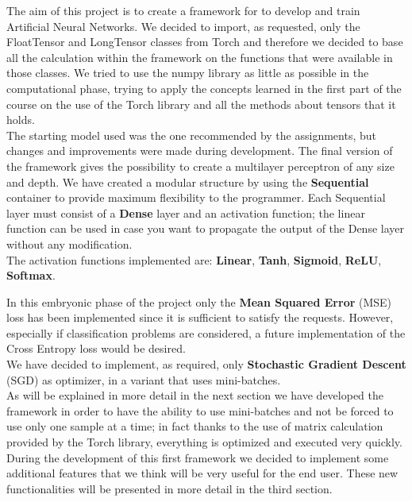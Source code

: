 The aim of this project is to create a framework for to develop and train Artificial Neural Networks. We decided to import, as requested, only the FloatTensor and LongTensor classes from Torch and therefore we decided to base all the calculation within the framework on the functions that were available in those classes. We tried to use the numpy library as little as possible in the computational phase, trying to apply the concepts learned in the first part of the course on the use of the Torch library and all the methods about tensors that it holds.\\
The starting model used was the one recommended by the assignments, but changes and improvements were made during development. The final version of the framework gives the possibility to create a multilayer perceptron of any size and depth. We have created a modular structure by using the \textbf{Sequential} container to provide maximum flexibility to the programmer. Each Sequential layer must consist of a \textbf{Dense} layer and an activation function; the linear function can be used in case you want to propagate the output of the Dense layer without any modification. \\
The activation functions implemented are: \textbf{Linear}, \textbf{Tanh}, \textbf{Sigmoid}, \textbf{ReLU}, \textbf{Softmax}. \\
\begin{comment}
\begin{itemize}
	\item Linear
	\item Tanh
	\item Sigmoid
	\item Relu
	\item Softmax
\end{itemize}
\end{comment}
In this embryonic phase of the project only the \textbf{Mean Squared Error} (MSE) loss has been implemented since it is sufficient to satisfy the requests. However, especially if classification problems are considered, a future implementation of the Cross Entropy loss would be desired. \\
We have decided to implement, as required, only \textbf{Stochastic Gradient Descent} (SGD) as optimizer, in a variant that uses mini-batches. \\
As will be explained in more detail in the next section we have developed the framework in order to have the ability to use mini-batches and not be forced to use only one sample at a time; in fact thanks to the use of matrix calculation provided by the Torch library, everything is optimized and executed very quickly. \\
During the development of this first framework we decided to implement some additional features that we think will be very useful for the end user. These new functionalities will be presented in more detail in the third section.

